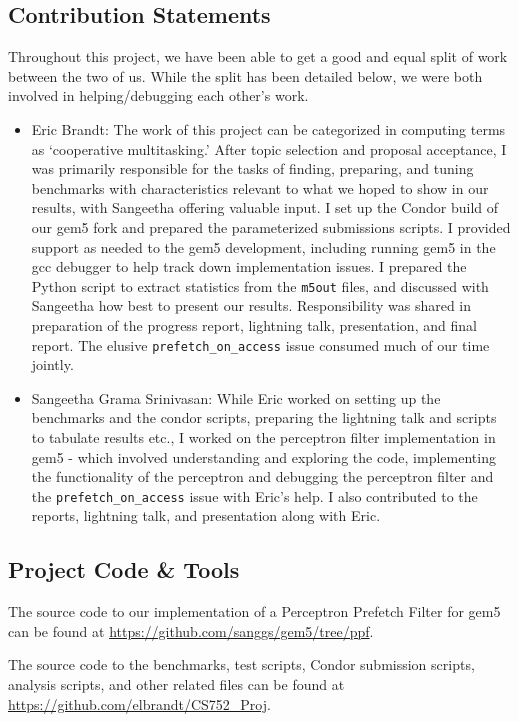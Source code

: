 \documentclass[10pt,conference]{IEEEtran}
\begin{document}
\subsection{Contribution Statements}
Throughout this project, we have been able to get a good and equal split of work between the two of us. While the split has been detailed below, we were both involved in helping/debugging each other's work. 
\begin{itemize}
    \item Eric Brandt: The work of this project can be categorized in computing terms as `cooperative multitasking.' After topic selection and proposal acceptance, I was primarily responsible for the tasks of finding, preparing, and tuning benchmarks with characteristics relevant to what we hoped to show in our results, with Sangeetha offering valuable input. I set up the Condor build of our gem5 fork and prepared the parameterized submissions scripts. I provided support as needed to the gem5 development, including running gem5 in the gcc debugger to help track down implementation issues. I prepared the Python script to extract statistics from the \texttt{m5out} files, and discussed with Sangeetha how best to present our results. Responsibility was shared in preparation of the progress report, lightning talk, presentation, and final report. The elusive \texttt{prefetch\_on\_access} issue consumed much of our time jointly.
    \item Sangeetha Grama Srinivasan: While Eric worked on setting up the benchmarks and the condor scripts, preparing the lightning talk and scripts to tabulate results etc., I worked on the perceptron filter implementation in gem5 - which involved understanding and exploring the code, implementing the functionality of the perceptron and debugging the perceptron filter and the \texttt{prefetch\_on\_access} issue with Eric's help. I also contributed to the reports, lightning talk, and presentation along with Eric.
\end{itemize}

\subsection{Project Code \& Tools}
The source code to our implementation of a Perceptron Prefetch Filter for gem5 can be found at \mbox{\url{https://github.com/sanggs/gem5/tree/ppf}}.

The source code to the benchmarks, test scripts, Condor submission scripts, analysis scripts, and other related files can be found at \mbox{\url{https://github.com/elbrandt/CS752\_Proj}}.
\end{document}
